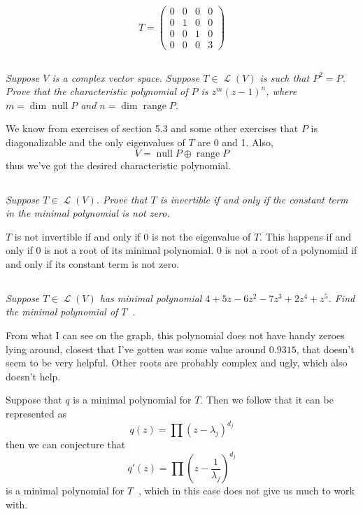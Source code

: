 \documentclass[11pt,oneside,titlepage]{book}
\DeclareMathOperator \map {\mathcal {L}}
\DeclareMathOperator \ns {null}
\DeclareMathOperator \range {range}
\DeclareMathOperator \inv {^{-1}}
\begin{document}
$$
T =
\begin{pmatrix}
  0 & 0 & 0 & 0 \\
  0 & 1 & 0 & 0 \\
  0 & 0 & 1 & 0 \\
  0 & 0 & 0 & 3
\end{pmatrix}
$$

\subsection{}

\textit{Suppose $V$ is a complex vector space. Suppose $T \in \map(V)$ is such that
  $P^2 = P$. Prove that the characteristic polynomial of $P$ is $z^m(z - 1)^n$,
  where $m = \dim \ns P$ and $n = \dim \range P$.}

We know from exercises of section 5.3 and some other exercises that $P$ is diagonalizable and
the only eigenvalues of $T$ are 0 and 1. Also,
$$V = \ns P \oplus \range P$$
thus we've got the desired characteristic polynomial.

\subsection{}

\textit{Suppose $T \in \map(V)$. Prove that $T$ is invertible if and only if the
  constant term in the minimal polynomial is not zero.}

$T$ is not invertible if and only if $0$ is not the eigenvalue of $T$. This happens
if and only if 0 is not a root of its minimal polynomial. 0 is not a root of
a polynomial if and only if its constant term is not zero.

\subsection{}

\textit{Suppose $T \in \map(V)$ has minimal polynomial $4 + 5z - 6z^2 - 7z^3 + 2z^4 + z^5$.
  Find the minimal polynomial of $T\inv$.}

From what I can see on the graph, this polynomial does not have  handy zeroes lying around,
closest that I've gotten was some value around $0.9315$, that doesn't seem to be very helpful.
Other roots are probably complex and ugly, which also doesn't help.

Suppose that $q$ is a minimal polynomial for $T$. Then we follow that
it can be represented as
$$q(z) = \prod{(z - \lambda_j)^{d_j}}$$
then we can conjecture that
$$q'(z) = \prod{(z - \frac{1}{\lambda_j})^{d_j}}$$
is a minimal polynomial for $T\inv$, which in this case does not give us much to work with.
\end{document}
